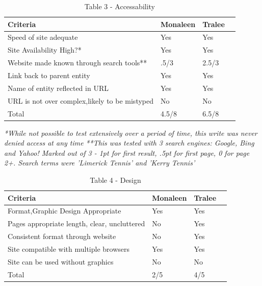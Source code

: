 \begin{table}[H]
\caption{Table 3 - Accessability}
\begin{center}
    \begin{tabular}{ | l | l | l | p{5cm} |}
    \hline
	\textbf{Criteria} & \textbf{Monaleen} & \textbf{Tralee}\\ \hline
	Speed of site adequate& Yes & Yes\\ \hline
	Site Availability High?* & Yes & Yes\\ \hline
	Website made known through search tools** & .5/3 & 2.5/3\\ \hline
	Link back to parent entity & Yes & Yes\\ \hline	
	Name of entity reflected in URL & Yes & Yes\\ \hline	
	URL is not over complex,likely to be mistyped & No& No\\
	\hline	
	Total & 4.5/8 & 6.5/8\\ \hline	
    \end{tabular}
\end{center}
\label{fig:table3}
\end{table}
\textit{*While not possible to test extensively over a period of time, this write was never denied access at any time}\newline
\textit{**This was tested with 3 search engines: Google, Bing and Yahoo! Marked out of 3 - 1pt for first result, .5pt for first page, 0 for page 2+. Search terms were 'Limerick Tennis' and 'Kerry Tennis'}

\begin{table}[H]
\caption{Table 4 - Design}
\begin{center}
    \begin{tabular}{ | l | l | l | p{5cm} |}
    \hline
	\textbf{Criteria} & \textbf{Monaleen} & \textbf{Tralee}\\ \hline
	Format,Graphic Design Appropriate & Yes & Yes\\ \hline
	Pages appropriate length, clear, uncluttered& No & Yes\\ \hline
	Consistent format through website & No & Yes\\ \hline
	Site compatible with multiple browsers & Yes & Yes\\ \hline
	Site can be used without graphics & No & No\\ \hline
	Total & 2/5 & 4/5\\ \hline	
    \end{tabular}
\end{center}
\label{fig:table4}
\end{table}

